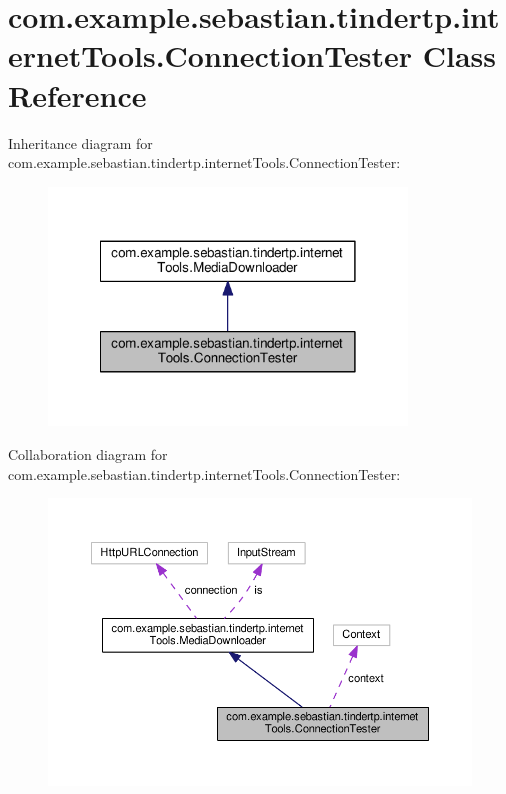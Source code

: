\hypertarget{classcom_1_1example_1_1sebastian_1_1tindertp_1_1internetTools_1_1ConnectionTester}{}\section{com.\+example.\+sebastian.\+tindertp.\+internet\+Tools.\+Connection\+Tester Class Reference}
\label{classcom_1_1example_1_1sebastian_1_1tindertp_1_1internetTools_1_1ConnectionTester}


Inheritance diagram for com.\+example.\+sebastian.\+tindertp.\+internet\+Tools.\+Connection\+Tester\+:
\nopagebreak
\begin{figure}[H]
\begin{center}
\leavevmode
\includegraphics[width=270pt]{classcom_1_1example_1_1sebastian_1_1tindertp_1_1internetTools_1_1ConnectionTester__inherit__graph}
\end{center}
\end{figure}


Collaboration diagram for com.\+example.\+sebastian.\+tindertp.\+internet\+Tools.\+Connection\+Tester\+:
\nopagebreak
\begin{figure}[H]
\begin{center}
\leavevmode
\includegraphics[width=350pt]{classcom_1_1example_1_1sebastian_1_1tindertp_1_1internetTools_1_1ConnectionTester__coll__graph}
\end{center}
\end{figure}

